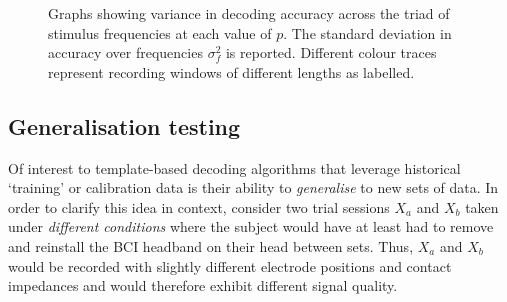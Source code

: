 \begin{figure}[h]

\hfill
{}
\caption[Graphs showing variance in decoding accuracy across the triad of stimulus frequencies at each value of $p$.]{Graphs showing variance in decoding accuracy across the triad of stimulus frequencies at each value of $p$. The standard deviation in accuracy over frequencies $\sigma_f^2$ is reported. Different colour traces represent recording windows of different lengths as labelled.}
\label{fig:freq-var-plots}
\end{figure}


\subsection{Generalisation testing}
\label{subsection:generalisation-testing}
Of interest to template-based decoding algorithms that leverage historical `training' or calibration data is their ability to \textit{generalise} to new sets of data. In order to clarify this idea in context, consider two trial sessions $X_a$ and $X_b$ taken under \textit{different conditions} where the subject would have at least had to remove and reinstall the BCI headband on their head between sets. Thus, $X_a$ and $X_b$ would be recorded with slightly different electrode positions and contact impedances and would therefore exhibit different signal quality. 

